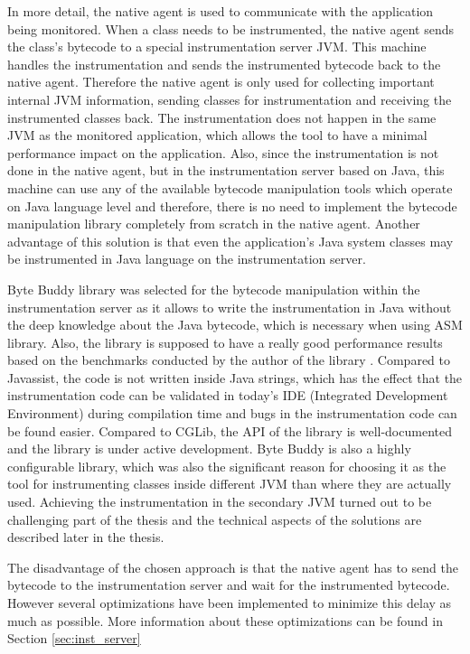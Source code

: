 In more detail, the native agent is used to communicate with the application being monitored. When a class needs to be instrumented, the native agent sends the class's bytecode to a special instrumentation server JVM. This machine handles the instrumentation and sends the instrumented bytecode back to the native agent. Therefore the native agent is only used for collecting important internal JVM information, sending classes for instrumentation and receiving the instrumented classes back. The instrumentation does not happen in the same JVM as the monitored application, which allows the tool to have a minimal performance impact on the application. Also, since the instrumentation is not done in the native agent, but in the instrumentation server based on Java, this machine can use any of the available bytecode manipulation tools which operate on Java language level and therefore, there is no need to implement the bytecode manipulation library completely from scratch in the native agent. Another advantage of this solution is that even the application's Java system classes may be instrumented in Java language on the instrumentation server.

Byte Buddy library was selected for the bytecode manipulation within the instrumentation server  as it allows to write the instrumentation in Java without the deep knowledge about the Java bytecode, which is necessary when using ASM library. Also, the library is supposed to have a really good performance results based on the benchmarks conducted by the author of the library \cite{ByteBuddy_Perf}. Compared to Javassist, the code is not written inside Java strings, which has the effect that the instrumentation code can be validated in today's IDE (Integrated Development Environment) during compilation time and bugs in the instrumentation code can be found easier. Compared to CGLib, the API of the library is well-documented and the library is under active development. Byte Buddy is also a highly configurable library, which was also the significant reason for choosing it as the tool for instrumenting classes inside different JVM than where they are actually used. Achieving the instrumentation in the secondary JVM  turned out to be challenging part of the thesis and the technical aspects of the solutions are described later in the thesis.

The disadvantage of the chosen approach is that the native agent has to send the bytecode to the instrumentation server and wait for the instrumented bytecode. However several optimizations have been implemented to minimize this delay as much as possible. More information about these optimizations can be found in Section \ref{sec:inst_server}
			
